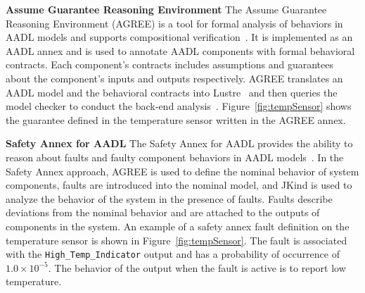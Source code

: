 
\textbf{Assume Guarantee Reasoning Environment}
The Assume Guarantee Reasoning Environment (AGREE) is a tool for formal analysis of behaviors in AADL models and supports compositional verification~\cite{cofer2012compositional}.  It is implemented as an AADL annex and is used to annotate AADL components with formal behavioral contracts. Each component's contracts includes assumptions and guarantees about the component's inputs and outputs respectively. AGREE translates an AADL model and the behavioral contracts into Lustre~\cite{Halbwachs91:IEEE} and then queries the \jkind model checker to conduct the back-end analysis~\cite{2017arXiv171201222G}. Figure~\ref{fig:tempSensor} shows the guarantee defined in the temperature sensor written in the AGREE annex.


\textbf{Safety Annex for AADL}
The Safety Annex for AADL provides the ability to reason about faults and faulty component behaviors in AADL models~\cite{Stewart17:IMBSA,stewart2020safety}. In the Safety Annex approach, AGREE is used to define the nominal behavior of system components, faults are introduced into the nominal model, and JKind is used to analyze the behavior of the system in the presence of faults. Faults describe deviations from the nominal behavior and are attached to the outputs of components in the system. An example of a safety annex fault definition on the temperature sensor is shown in Figure~\ref{fig:tempSensor}. The fault is associated with the \texttt{High\_Temp\_Indicator} output and has a probability of occurrence of $1.0 \times 10^{-5}$. The behavior of the output when the fault is active is to report low temperature. 